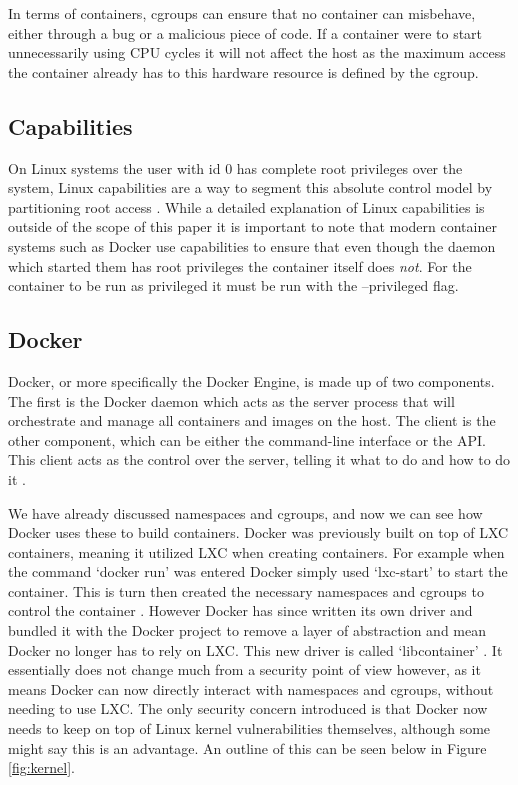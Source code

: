 \documentclass{article}
\begin{document}
In terms of containers, cgroups can ensure that no container can misbehave, either through a bug or a malicious piece of code. If a container were to start unnecessarily using CPU cycles it will not affect the host as the maximum access the container already has to this hardware resource is defined by the cgroup.

\subsection{Capabilities}
\label{subs:Capabilities}
On Linux systems the user with id 0 has complete root privileges over the system, Linux capabilities are a way to segment this absolute control model by partitioning root access \citep{Whitepaper2016}. While a detailed explanation of Linux capabilities is outside of the scope of this paper it is important to note that modern container systems such as Docker use capabilities to ensure that even though the daemon which started them has root privileges the container itself does \textit{not}. For the container to be run as privileged it must be run with the --privileged flag. 

\subsection{Docker}
\label{subs:Docker}

Docker, or more specifically the Docker Engine, is made up of two components. The first is the Docker daemon which acts as the server process that will orchestrate and manage all containers and images on the host. The client is the other component, which can be either the command-line interface or the API. This client acts as the control over the server, telling it what to do and how to do it \citep{Docker2016}.

We have already discussed namespaces and cgroups, and now we can see how Docker uses these to build containers. Docker was previously built on top of LXC containers, meaning it utilized LXC when creating containers. For example when the command `docker run' was entered Docker simply used `lxc-start' to start the container. This is turn then created the necessary namespaces and cgroups to control the container \citep{Petazzoni2013}. However Docker has since written its own driver and bundled it with the Docker project to remove a layer of abstraction and mean Docker no longer has to rely on LXC. This new driver is called `libcontainer' \citep{Hykes2014}. It essentially does not change much from a security point of view however, as it means Docker can now directly interact with namespaces and cgroups, without needing to use LXC. The only security concern introduced is that Docker now needs to keep on top of Linux kernel vulnerabilities themselves, although some might say this is an advantage. An outline of this can be seen below in Figure \ref{fig:kernel}.
\end{document}
